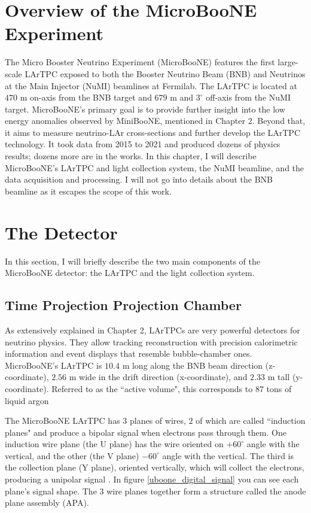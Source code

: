 \section{Overview of the MicroBooNE Experiment}

The Micro Booster Neutrino Experiment (MicroBooNE) features the first large-scale LArTPC exposed to both the Booster Neutrino Beam (BNB) and Neutrinos at the Main Injector (NuMI) beamlines at Fermilab. The LArTPC is located at $470$ m on-axis from the BNB target and $679$ m and $3^{\circ}$ off-axis from the NuMI target. MicroBooNE's primary goal is to provide further insight into the low energy anomalies observed by MiniBooNE, mentioned in Chapter 2. Beyond that, it aims to measure neutrino-LAr cross-sections and further develop the LArTPC technology. It took data from 2015 to 2021 and produced dozens of physics results; dozens more are in the works. 
In this chapter, I will describe MicroBooNE's LArTPC and light collection system, the NuMI beamline, and the data acquisition and processing. I will not go into details about the BNB beamline as it escapes the scope of this work.

\section{The Detector}

In this section, I will briefly describe the two main components of the MicroBooNE detector: the LArTPC and the light collection system.
\subsection{Time Projection Projection Chamber}
As extensively explained in Chapter 2, LArTPCs are very powerful detectors for neutrino physics. They allow tracking reconstruction with precision calorimetric information and event displays that resemble bubble-chamber ones. MicroBooNE's LArTPC is $10.4$ m long along the BNB beam direction (z-coordinate), $2.56$ m wide in the drift direction (x-coordinate), and $2.33$ m tall (y-coordinate). Referred to as the ``active volume", this corresponds to $87$ tons of liquid argon 

The MicroBooNE LArTPC has $3$ planes of wires, $2$ of which are called ``induction planes" and produce a bipolar signal when electrons pass through them. One induction wire plane (the U plane) has the wire oriented on $+60^{\circ}$ angle with the vertical, and the other (the V plane) $-60^{\circ}$ angle with the vertical. The third is the collection plane (Y plane), oriented vertically, which will collect the electrons, producing a unipolar signal \cite{microboone_electronics}. In figure \ref{uboone_digital_signal} you can see each plane's signal shape. The $3$ wire planes together form a structure called the anode plane assembly (APA). 

